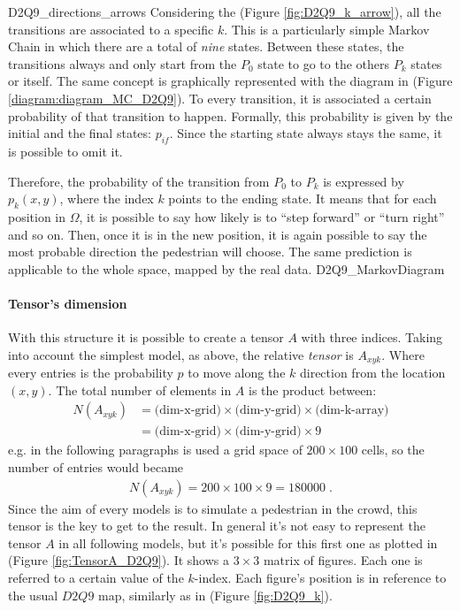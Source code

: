 \documentclass[class=article, crop=false]{standalone}
\begin{document}
	{D2Q9_directions_arrows}
Considering the (Figure \ref{fig:D2Q9_k_arrow}), all the transitions are associated to a specific $k$. 
This is a particularly simple Markov Chain in which there are a total of \emph{nine} states. 
Between these states, the transitions always and only start from the $P_0$ state to go to the others $P_k$ states or itself. 
The same concept is graphically represented with the diagram in (Figure \ref{diagram:diagram_MC_D2Q9}). 
To every transition, it is associated a certain probability of that transition to happen. 
Formally, this probability is given by the initial and the final states: $p_{if}$. 
Since the starting state always stays the same, it is possible to omit it. 

Therefore, the probability of the transition from $P_0$ to $P_k$ is expressed by $p_k(x, y)$, where the index $k$ points to the ending state. 
It means that for each position in $\Omega$, it is possible to say how likely is to “step forward” or “turn right” and so on. 
Then, once it is in the new position, it is again possible to say the most probable direction the pedestrian will choose. 
The same prediction is applicable to the whole space, mapped by the real data.
	{D2Q9_MarkovDiagram}


\paragraph{Tensor's dimension}
With this structure it is possible to create a tensor $A$ with three indices.
Taking into account the simplest model, as above, the relative \emph{tensor} is $A_{x y k}$.
Where every entries is the probability $p$ to move along the $k$ direction from the location $(x, y)$.
The total number of elements in $A$ is the product between: 
\begin{equation*}
\begin{split}
N(A_{xyk}) &= \mbox{(dim-x-grid)} \times \mbox{(dim-y-grid)} \times \mbox{(dim-k-array)} \\
& = \mbox{(dim-x-grid)} \times \mbox{(dim-y-grid)} \times 9
\end{split}
\end{equation*}
e.g. in the following paragraphs is used a grid space of $200\times100$ cells, so the number of entries would became 
\begin{equation*}
\begin{split}
N(A_{xyk})=200\times100\times9 = 180000 \; .
\end{split}
\end{equation*}
Since the aim of every models is to simulate a pedestrian in the crowd, this tensor is the key to get to the result.
In general it's not easy to represent the tensor $A$ in all following models, but it's possible for this first one as plotted in (Figure \ref{fig:TensorA_D2Q9}).
It shows a $3\times3$ matrix of figures.
Each one is referred to a certain value of the $k$-index.
Each figure's position is in reference to the usual $D2Q9$ map, similarly as in (Figure \ref{fig:D2Q9_k}).
\end{document}
